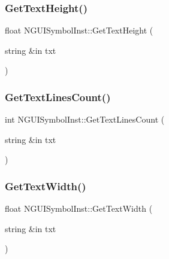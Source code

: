\hypertarget{class_n_g_u_i_symbol_inst_acc7696e689a4d12732d8b0551479bae7}{}\label{class_n_g_u_i_symbol_inst_acc7696e689a4d12732d8b0551479bae7} 
\subsubsection{\texorpdfstring{Get\+Text\+Height()}{GetTextHeight()}}
{\footnotesize\ttfamily float N\+G\+U\+I\+Symbol\+Inst\+::\+Get\+Text\+Height (\begin{DoxyParamCaption}\item[{string \&in}]{txt }\end{DoxyParamCaption})}

\hypertarget{class_n_g_u_i_symbol_inst_a9fe942be44d88bbd95cc6fc43878b012}{}\label{class_n_g_u_i_symbol_inst_a9fe942be44d88bbd95cc6fc43878b012} 
\subsubsection{\texorpdfstring{Get\+Text\+Lines\+Count()}{GetTextLinesCount()}}
{\footnotesize\ttfamily int N\+G\+U\+I\+Symbol\+Inst\+::\+Get\+Text\+Lines\+Count (\begin{DoxyParamCaption}\item[{string \&in}]{txt }\end{DoxyParamCaption})}

\hypertarget{class_n_g_u_i_symbol_inst_a7c510f7e08918ff1fb59a6c3c3c6032e}{}\label{class_n_g_u_i_symbol_inst_a7c510f7e08918ff1fb59a6c3c3c6032e} 
\subsubsection{\texorpdfstring{Get\+Text\+Width()}{GetTextWidth()}}
{\footnotesize\ttfamily float N\+G\+U\+I\+Symbol\+Inst\+::\+Get\+Text\+Width (\begin{DoxyParamCaption}\item[{string \&in}]{txt }\end{DoxyParamCaption})}

